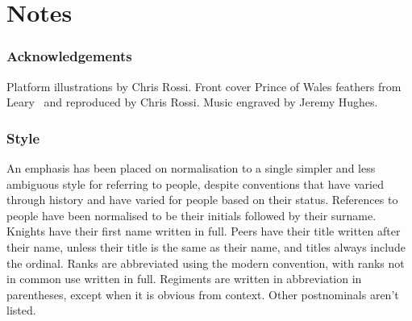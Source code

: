\part{Notes}

\section*{Acknowledgements}

Platform illustrations by Chris Rossi. Front cover Prince of Wales feathers from Leary~\cite{leary} and reproduced by Chris Rossi. Music engraved by Jeremy Hughes.

\section*{Style}

An emphasis has been placed on normalisation to a single simpler and less ambiguous style for referring to people, despite conventions that have varied through history and have varied for people based on their status. References to people have been normalised to be their initials followed by their surname. Knights have their first name written in full. Peers have their title written after their name, unless their title is the same as their name, and titles always include the ordinal. Ranks are abbreviated using the modern convention, with ranks not in common use written in full. Regiments are written in abbreviation in parentheses, except when it is obvious from context. Other postnominals aren't listed.
